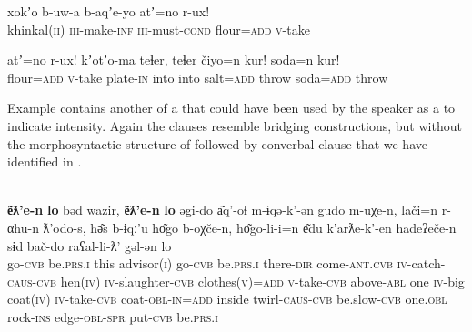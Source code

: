 \documentclass[output=paper]{LSP/langsci}
\begin{document}
\begin{exe}
	\ex	\label{ex:24ab} 
	\begin{xlist}
		\ex	\label{ex:24a}
		\gll	xokʼo  b-uw-a   b-aqʼe-yo   atʼ=no   r-ux!\\
			khinkal(\textsc{ii}) \textsc{iii}-make-\textsc{inf} \textsc{iii}-must-\textsc{cond} flour=\textsc{add}  \textsc{v}-take\\
		\glt	{}

		\ex	\label{ex:24b}
		\gll	atʼ=no   r-ux!   kʼotʼo-ma    teɬer, teɬer čiyo=n    kur!         soda=n    kur!\\
			flour=\textsc{add}  \textsc{v}-take plate-\textsc{in} into into salt=\textsc{add} throw soda=\textsc{add}  throw\\
		\glt	{} 
	\end{xlist}
\end{exe}


Example  contains another  of a  that could have been used by the speaker as a  to indicate intensity. Again the clauses resemble bridging constructions, but without the morphosyntactic structure of  followed by converbal clause that we have identified in .


\ea\label{ex:25ab}
\\
\gll \textbf{e͂ƛ'e-n} 	\textbf{lo} 			bəd 	wazir,  		\textbf{e͂ƛ'e-n} 	\textbf{lo} 			əgi-do 		a͂q'-oɬ m-ɨqə-k'-ən 			gudo 		m-uχe-n, 				lači=n 				r-αhu-n  ƛ'odo-s, 		hə͂s	 b-ɨqː'u 	ho͂go 		b-oχče-n, 		ho͂go-li-i=n 			e͂du k'arƛe-k'-en 	hadeʔeče-n 	sɨd 		bač-do 	raʕal-li-ƛ' 		gəl-ən 	lo \\
go-\textsc{cvb}	be.\textsc{prs.i}	this	advisor(\textsc{i})	go-\textsc{cvb}	be.\textsc{prs.i}	there-\textsc{dir}	come-\textsc{ant.cvb} \textsc{iv}-catch-\textsc{caus-cvb}	hen(\textsc{iv})	\textsc{iv}-slaughter-\textsc{cvb}		clothes(\textsc{v})=\textsc{add}		\textsc{v}-take-\textsc{cvb} above-\textsc{abl}	one	\textsc{iv}-big	coat(\textsc{iv})	\textsc{iv}-take-\textsc{cvb}		coat-\textsc{obl}-\textsc{in=add}	inside twirl-\textsc{caus-cvb}	be.slow-\textsc{cvb}	one.\textsc{obl}	rock-\textsc{ins}	edge-\textsc{obl-spr}	put-\textsc{cvb}	be.\textsc{prs.i}\\
\glt {} 
\z
\end{document}
